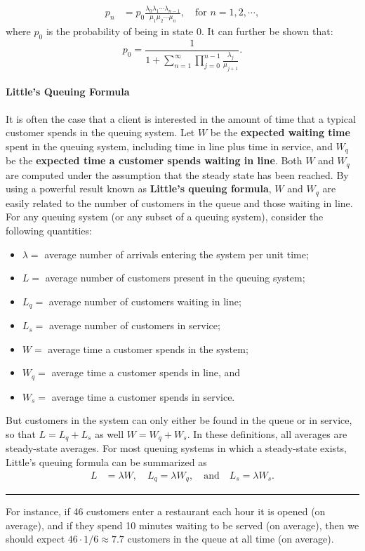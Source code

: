 \begin{align} p_{n} &= p_{0}\frac{\lambda_{0} \lambda_{1} \cdots \lambda_{n-1}}{\mu_{1} \mu_{2} \cdots \mu_{n}},\quad  \text{for    } n=1,2,\cdots,\label{eq:ssbr}
\end{align}
where $p_{0}$ is  the probability of being in state 0. It can further be shown  \cite{QS_K1} that:
$$ p_{0} = \frac{1}{1+ \sum^{\infty}_{n=1} \prod^{n-1}_{j=0} \frac{\lambda_{j}}{\mu_{j+1}}}.$$ 

\paragraph{Little's Queuing Formula}
It is often the case that a client is interested in the amount of time that a typical customer spends in the queuing system. Let $W$ be the \textbf{expected waiting time} spent in the queuing system, including time in line plus time in service, and $W_{q}$ be the \textbf{expected time a customer spends waiting in line}. Both $W$ and $W_{q}$ are computed under the assumption that the steady state has been reached. By using a powerful result known as \textbf{Little's queuing formula}, $W$ and $W_{q}$ are easily related to the number of customers in the queue and those waiting in line. \newl  For any queuing system (or any subset of a queuing system), consider the following quantities:
\begin{itemize}[noitemsep]
\item $\lambda = $  average number of arrivals entering the system per unit time; 
\item $L =$  average number of customers present in the queuing system;
\item $L_{q} = $  average number of customers waiting in line;
\item $L_{s} = $  average number of customers in service;
\item $W = $  average time a customer spends in the system;
\item $W_{q} = $  average time a customer spends in line, and
\item $W_{s} = $  average time a customer spends in service.
\end{itemize}
But customers in the system can only either be found in the queue or in service, so that $L = L_{q} + L_{s}$ as well $W = W_{q} + W_{s}$.  In these definitions, all averages are steady-state averages. For most queuing systems in which a steady-state exists, Little's queuing formula can be summarized as 
\begin{align*}
L &=  \lambda W, \quad L_{q} = \lambda W_{q}, \quad\mbox{and}
\quad L_{s}= \lambda W_{s}.
\end{align*}
\begin{center}
    \rule{0.5\textwidth}{.4pt}
\end{center}
For instance, if 46 customers enter a restaurant each hour it is opened (on average), and if they spend 10 minutes waiting to be served (on average), then we should expect $46\cdot 1/6 \approx 7.7$ customers in the queue at all time (on average).   

